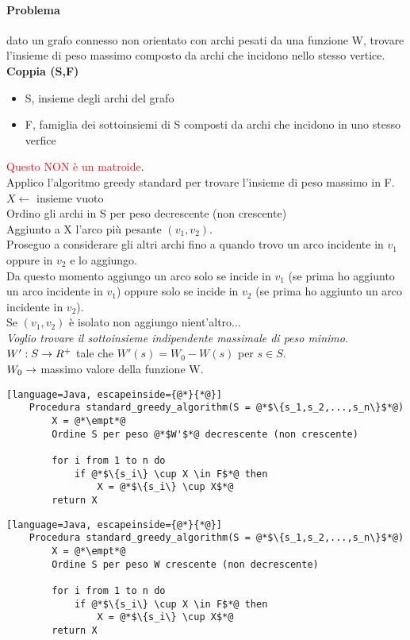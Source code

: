 \paragraph*{Problema} dato un grafo connesso non orientato con archi pesati da 
una funzione W, trovare l'insieme di peso massimo composto da archi che incidono
nello stesso vertice.\\
\textbf{Coppia (S,F)}
\begin{itemize}
    \item S, insieme degli archi del grafo
    \item F, famiglia dei sottoinsiemi di S composti da archi che incidono in uno
     stesso verfice
\end{itemize}
\textcolor{red}{Questo NON è un matroide}.\\
Applico l'algoritmo greedy standard per trovare l'insieme di peso massimo in F.\\
$X \leftarrow$ insieme vuoto\\
Ordino gli archi in S per peso decrescente (non crescente)\\
Aggiunto a X l'arco più pesante $(v_1, v_2)$.\\
Proseguo a considerare gli altri archi fino a quando trovo un arco incidente in
$v_1$ oppure in $v_2$ e lo aggiungo.\\
Da questo momento aggiungo un arco solo se incide in $v_1$ (se prima ho aggiunto un arco
incidente in $v_1$) oppure solo se incide in $v_2$ (se prima ho aggiunto un arco incidente in
$v_2$).\\
Se $(v_1,v_2)$ è isolato non aggiungo nient'altro...\\
\textit{Voglio trovare il sottoinsieme indipendente massimale di peso minimo}.\\
$W':S \rightarrow R^+$ tale che $W'(s)=W_0 - W(s)$ per $s \in S$.\\
$W_0 \rightarrow$ massimo valore della funzione W.
\begin{lstlisting}[language=Java, escapeinside={@*}{*@}]
    Procedura standard_greedy_algorithm(S = @*$\{s_1,s_2,...,s_n\}$*@)
        X = @*\empt*@
        Ordine S per peso @*$W'$*@ decrescente (non crescente)

        for i from 1 to n do
            if @*$\{s_i\} \cup X \in F$*@ then
                X = @*$\{s_i\} \cup X$*@
        return X
\end{lstlisting}
\begin{lstlisting}[language=Java, escapeinside={@*}{*@}]
    Procedura standard_greedy_algorithm(S = @*$\{s_1,s_2,...,s_n\}$*@)
        X = @*\empt*@
        Ordine S per peso W crescente (non decrescente)

        for i from 1 to n do
            if @*$\{s_i\} \cup X \in F$*@ then
                X = @*$\{s_i\} \cup X$*@
        return X
\end{lstlisting}


